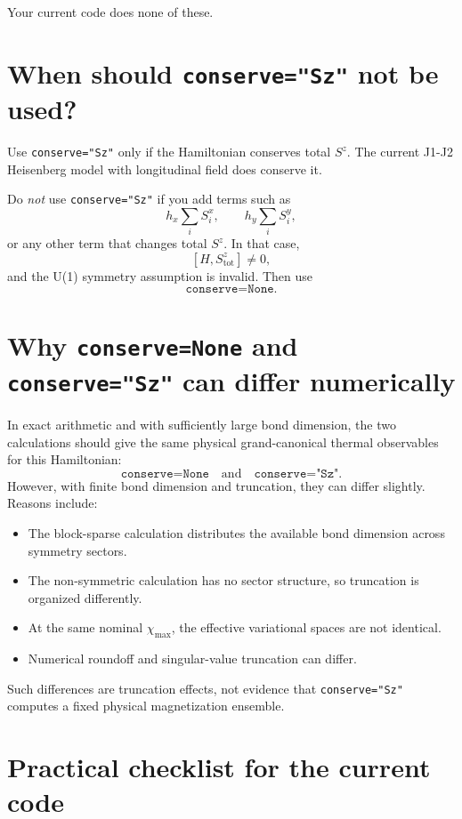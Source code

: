 \documentclass[11pt]{article}
\begin{document}
Your current code does none of these.

\section{When should \texttt{conserve="Sz"} not be used?}

Use \texttt{conserve="Sz"} only if the Hamiltonian conserves total \(S^z\).
The current J1-J2 Heisenberg model with longitudinal field does conserve it.

Do \emph{not} use \texttt{conserve="Sz"} if you add terms such as
\[
h_x\sum_i S_i^x,
\qquad
h_y\sum_i S_i^y,
\]
or any other term that changes total \(S^z\). In that case,
\[
[H,S^z_{\mathrm{tot}}]\neq 0,
\]
and the U(1) symmetry assumption is invalid. Then use
\[
\texttt{conserve=None}.
\]

\section{Why \texttt{conserve=None} and \texttt{conserve="Sz"} can differ numerically}

In exact arithmetic and with sufficiently large bond dimension, the two
calculations should give the same physical grand-canonical thermal observables
for this Hamiltonian:
\[
\texttt{conserve=None}
\quad\text{and}\quad
\texttt{conserve="Sz"}.
\]
However, with finite bond dimension and truncation, they can differ slightly.
Reasons include:

\begin{itemize}
\item The block-sparse calculation distributes the available bond dimension
across symmetry sectors.
\item The non-symmetric calculation has no sector structure, so truncation is
organized differently.
\item At the same nominal \(\chi_{\max}\), the effective variational spaces are
not identical.
\item Numerical roundoff and singular-value truncation can differ.
\end{itemize}

Such differences are truncation effects, not evidence that
\texttt{conserve="Sz"} computes a fixed physical magnetization ensemble.

\section{Practical checklist for the current code}
\end{document}
